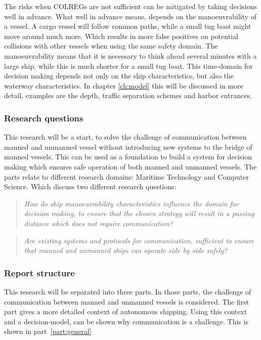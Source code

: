 The risks when \ac{COLREGs} are not sufficient can be mitigated by taking decisions well in advance. What well in advance means, depends on the manoeuvrability of a vessel. A cargo vessel will follow common paths, while a small tug boat might move around much more. Which results in more false positives on potential collisions with other vessels when using the same safety domain. The manoeuvrability means that it is necessary to think ahead several minutes with a large ship, while this is much shorter for a small tug boat. This time-domain for decision making depends not only on the ship characteristics, but also the waterway characteristics. In chapter \ref{ch:model} this will be discussed in more detail, examples are the depth, traffic separation schemes and harbor entrances.

\subsubsection*{Research questions}
This research will be a start, to solve the challenge of communication between manned and unmanned vessel without introducing new systems to the bridge of manned vessels. This can be used as a foundation to build a system for decision making which ensures safe operation of both manned and unmanned vessels. The parts relate to different research domains: Maritime Technology and Computer Science. Which discuss two different research questions:

\begin{quotation}
	\emph{How do ship manoeuvrability characteristics influence the domain for decision making, to ensure that the chosen strategy will result in a passing distance which does not require communication?} 
\end{quotation}

\begin{quotation}
	\emph{Are existing systems and protocols for communication, sufficient to ensure that manned and unmanned ships can operate side by side safely?}
\end{quotation}

\subsubsection*{Report structure}
This research will be separated into three parts. In those parts, the challenge of communication between manned and unmanned vessels is considered. The first part gives a more detailed context of autonomous shipping. Using this context and a decision-model, can be shown why communication is a challenge. This is shown in part~\ref{part:general}

